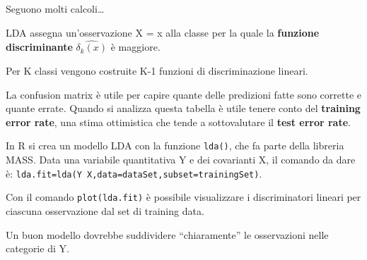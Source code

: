 Seguono molti calcoli\dots

LDA assegna un'osservazione X = x alla classe per la quale la \textbf{funzione
discriminante} $\hat{\delta_k(x)}$ è maggiore.

Per K classi vengono costruite K-1 funzioni di discriminazione lineari.

La confusion matrix è utile per capire quante delle predizioni fatte sono
corrette e quante errate. Quando si analizza questa tabella è utile
tenere conto del \textbf{training error rate}, una stima ottimistica che
tende a sottovalutare il \textbf{test error rate}.

In R si crea un modello LDA con la funzione \texttt{lda()}, che fa parte
della libreria MASS. Data una variabile quantitativa Y e dei covarianti
X, il comando da dare è:
\texttt{lda.fit=lda(Y~X,data=dataSet,subset=trainingSet)}.

Con il comando \texttt{plot(lda.fit)} è possibile visualizzare
i discriminatori lineari per ciascuna osservazione dal set di training
data.

Un buon modello dovrebbe suddividere ``chiaramente'' le osservazioni
nelle categorie di Y.















